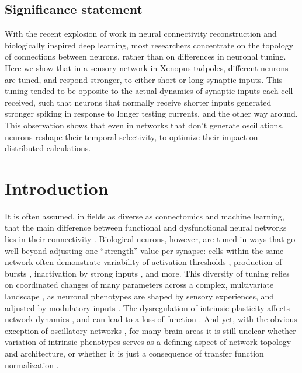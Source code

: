 \documentclass{article}
\begin{document}
\begin{flushleft}
\section*{Significance statement}
With the recent explosion of work in neural connectivity reconstruction and biologically inspired deep learning, most researchers concentrate on the topology of connections between neurons, rather than on differences in neuronal tuning. Here we show that in a sensory network in Xenopus tadpoles, different neurons are tuned, and respond stronger, to either short or long synaptic inputs. This tuning tended to be opposite to the actual dynamics of synaptic inputs each cell received, such that neurons that normally receive shorter inputs generated stronger spiking in response to longer testing currents, and the other way around. This observation shows that even in networks that don't generate oscillations, neurons reshape their temporal selectivity, to optimize their impact on distributed calculations. 
\bigskip

\end{flushleft} %

\section*{Introduction}

It is often assumed, in fields as diverse as connectomics and machine learning, that the main difference between functional and dysfunctional neural networks lies in their connectivity \citep{takemura2014,hildebrand2017,bassett2017network,reimann2017}. Biological neurons, however, are tuned in ways that go well beyond adjusting one “strength” value per synapse: cells within the same network often demonstrate variability of activation thresholds \citep{kole2012}, production of bursts \citep{popovic2011}, inactivation by strong inputs \citep{bianchi2012}, and more. This diversity of tuning relies on coordinated changes of many parameters across a complex, multivariate landscape \citep{oleary2013}, as neuronal phenotypes are shaped by sensory experiences, and adjusted by modulatory inputs \citep{evans2015}. The dysregulation of intrinsic plasticity affects network dynamics \citep{tien2018}, and can lead to a loss of function \citep{marcelin2009}. And yet, with the obvious exception of oscillatory networks \citep{marder2011,picton2018control}, for many brain areas it is still unclear whether variation of intrinsic phenotypes serves as a defining aspect of network topology and architecture, or whether it is just a consequence of transfer function normalization \citep{titley2017}.
\end{document}
